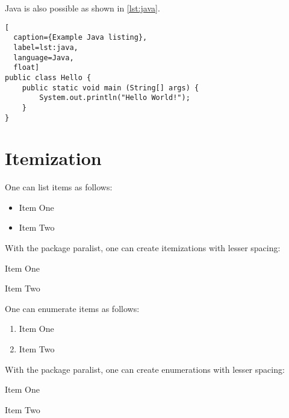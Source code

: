 \documentclass[
  numbers=noenddot,
  english,  %
  a4paper,  %
  twoside,  %
  bibliography=totoc,
  headsepline,
  cleardoublepage=empty,
  parskip=half,
  draft=false
]{scrbook}
\theoremstyle{break}
\begin{document}
Java is also possible as shown in \cref{lst:java}.

\begin{ltgexample}
\begin{lstlisting}[
  caption={Example Java listing},
  label=lst:java,
  language=Java,
  float]
public class Hello {
    public static void main (String[] args) {
        System.out.println("Hello World!");
    }
}
\end{lstlisting}
\end{ltgexample}

\section{Itemization}

One can list items as follows:

\begin{ltgexample}
\begin{itemize}
  \item Item One
  \item Item Two
\end{itemize}
\end{ltgexample}

With the package paralist, one can create itemizations with lesser spacing:

\begin{ltgexample}
\begin{compactitem}
  \item Item One
  \item Item Two
\end{compactitem}
\end{ltgexample}

One can enumerate items as follows:

\begin{ltgexample}
\begin{enumerate}
  \item Item One
  \item Item Two
\end{enumerate}
\end{ltgexample}

With the package paralist, one can create enumerations with lesser spacing:

\begin{ltgexample}
\begin{compactenum}
  \item Item One
  \item Item Two
\end{compactenum}
\end{ltgexample}
\end{document}
